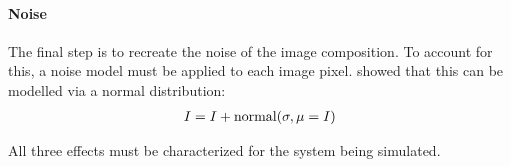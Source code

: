 \paragraph{Noise}
The final step is to recreate the noise of the image composition.
To account for this, a noise model must be applied to each image pixel.
\cite{Wiese:887678} showed that this can be modelled via a normal distribution:
%
\begin{align}
    I = I + \operatorname{normal}(\sigma, \mu=I)
\end{align}
%
\par
%
All three effects must be characterized for the system being simulated.
%
%
